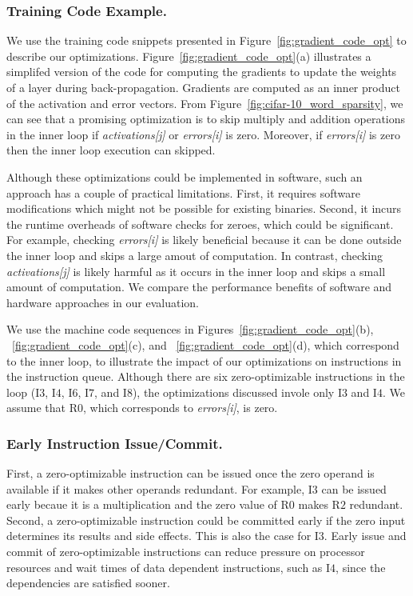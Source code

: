 \subsubsection{Training Code Example.}
We use the training code snippets presented in Figure~\ref{fig:gradient_code_opt} to describe our optimizations.  Figure~\ref{fig:gradient_code_opt}(a) illustrates a simplifed version of the code for computing the gradients to update the weights of a layer during back-propagation. Gradients are computed as an inner product of the activation and error vectors. From Figure~\ref{fig:cifar-10_word_sparsity}, we can see that a promising optimization is to skip multiply and addition operations in the inner loop if \emph{activations[j]} or \emph{errors[i]} is zero. Moreover, if \emph{errors[i]} is zero then the inner loop execution can skipped. 

Although these optimizations could be implemented in software, such an approach has a couple of practical limitations.   First, it requires software modifications which might not be possible for existing binaries.   Second, it incurs the runtime overheads of software checks for zeroes, which could be significant.  For example, checking \emph{errors[i]} is likely beneficial because it can be done outside the inner loop and skips a large amout of computation.  In contrast, checking \emph{activations[j]} is likely harmful as it occurs in the inner loop and skips a small amount of computation. We compare the performance benefits of software and hardware  approaches in our evaluation. 

We use the machine code sequences in Figures~\ref{fig:gradient_code_opt}(b), ~\ref{fig:gradient_code_opt}(c), and ~\ref{fig:gradient_code_opt}(d), which correspond to the inner loop, to illustrate the impact of our optimizations on instructions in the instruction queue.  Although there are six zero-optimizable instructions in the loop (I$3$, I$4$, I$6$, I$7$, and I$8$), the optimizations discussed invole only I$3$ and I$4$. We assume that R$0$, which corresponds to \emph{errors[i]}, is zero. 

\subsubsection{Early Instruction Issue/Commit.}  First, a zero-optimizable instruction can be issued once the zero operand is available if it makes other operands redundant.  For example, I$3$ can be issued early becaue it is a multiplication and the zero value of R$0$ makes R$2$ redundant.  Second, a zero-optimizable instruction could be committed early if the zero input determines its results and side effects. This is also the case for I$3$. Early issue and commit of zero-optimizable instructions can reduce pressure on processor resources and wait times of data dependent instructions, such as I$4$, since the dependencies are satisfied sooner. 

